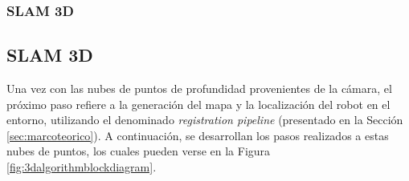 \subsubsection{SLAM 3D}
\fi
\subsection{SLAM 3D}
\fi

Una vez con las nubes de puntos de profundidad provenientes de la cámara, el próximo paso refiere a la generación del mapa y la localización del robot en el entorno, utilizando el denominado \textit{registration pipeline} (presentado en la Sección \ref{sec:marcoteorico}). A continuación, se desarrollan los pasos realizados a estas nubes de puntos, los cuales pueden verse en la Figura \ref{fig:3dalgorithmblockdiagram}.

